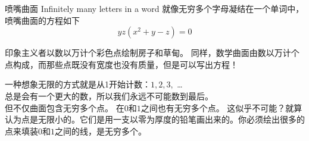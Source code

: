 ﻿\begin{surferPage}{喷嘴曲面}
Infinitely many letters in a word 就像无穷多个字母凝结在一个单词中，喷嘴曲面的方程如下\\
\smallskip
\[y z (x^2	+ y - z)	= 0\]

\vspace{0.3cm}

印象主义者以数以万计个彩色点绘制房子和草甸。 同样，数学曲面由数以万计个点构成，而那些点既没有宽度也没有质量，但是可以写出方程！\\

\vspace{0.3cm}

一种想象无限的方式就是从1开始计数：$1, 2, 3,$ \dots\\
总是会有一个更大的数，所以我们永远不可能数到最后。\\

\vspace{0.3cm}
但不仅曲面包含无穷多个点。 在$0$和$1$之间也有无穷多个点。 这似乎不可能？就算认为点是无限小的。它们是用一支以零为厚度的铅笔画出来的。你必须绘出很多的点来填装$0$和$1$之间的线，是无穷多个。
\end{surferPage}

